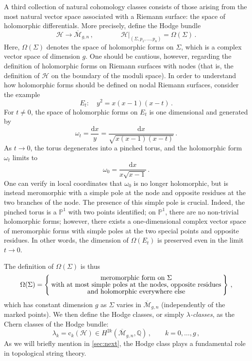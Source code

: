 \documentclass[11pt,reqno]{amsart}
\numberwithin{equation}{section}
\newcommand{\dd}{\mathrm{d}}
\newcommand{\cc}{\mathrm{c}}
\newcommand{\mb}[1]{\mathbb{#1}}
\newcommand{\mc}[1]{\mathcal{#1}}
\newcommand{\Q}{\mb{Q}}
\renewcommand{\P}{\mb{P}}
\newcommand{\M}{\mc{M}}
\newcommand{\Mbar}{\overline{\M}}
\theoremstyle{plain}
\theoremstyle{definition}
\begin{document}
A third collection of natural cohomology classes consists of those arising from the most natural vector space associated with a Riemann surface: the space of holomorphic differentials. More precisely, define the Hodge bundle
\begin{equation}
  \mc{H} \longrightarrow \Mbar_{g,n} \,,
  \qquad\qquad
  \mc{H}|_{(\Sigma,p_1,\dots,p_n)}
  =
  \Omega(\Sigma) \,.
\end{equation}
Here, $\Omega(\Sigma)$ denotes the space of holomorphic forms on $\Sigma$, which is a complex vector space of dimension $g$. One should be cautious, however, regarding the definition of holomorphic forms on Riemann surfaces with nodes (that is, the definition of $\mc{H}$ on the boundary of the moduli space). In order to understand how holomorphic forms should be defined on nodal Riemann surfaces, consider the example
\begin{equation}
  E_t \colon \quad
  y^2 = x (x-1) (x-t) \,.
\end{equation}
For $t \neq 0$, the space of holomorphic forms on $E_t$ is one dimensional and generated by
\begin{equation}
  \omega_t = \frac{\dd x}{y} = \frac{\dd x}{\sqrt{x(x-1)(x-t)}} \,.
\end{equation}
As $t \to 0$, the torus degenerates into a pinched torus, and the holomorphic form $\omega_t$ limits to
\begin{equation}
  \omega_0 = \frac{\dd x}{x \sqrt{x-1}} \,.
\end{equation}
One can verify in local coordinates that $\omega_0$ is no longer holomorphic, but is instead meromorphic with a simple pole at the node and opposite residues at the two branches of the node. The presence of this simple pole is crucial. Indeed, the pinched torus is a $\P^1$ with two points identified; on $\P^1$, there are no non-trivial holomorphic forms; however, there exists a one-dimensional complex vector space of meromorphic forms with simple poles at the two special points and opposite residues. In other words, the dimension of $\Omega(E_t)$ is preserved even in the limit $t \to 0$.

The definition of $\Omega(\Sigma)$ is thus
\begin{equation}
  \Omega(\Sigma)
  =
  \Set{\substack{
    \displaystyle\text{meromorphic form on $\Sigma$} \\
    \displaystyle\text{with at most simple poles at the nodes, opposite residues} \\
    \displaystyle\text{and holomorphic everywhere else}
  }} \,,
\end{equation}
which has constant dimension $g$ as $\Sigma$ varies in $\Mbar_{g,n}$ (independently of the marked points). We then define the Hodge classes, or simply \emph{$\lambda$-classes}, as the Chern classes of the Hodge bundle:
\begin{equation}
  \lambda_k = \cc_k(\mc{H}) \in H^{2k}(\Mbar_{g,n},\Q) \,,
  \qquad
  k = 0, \dots, g \,,
\end{equation}
As we will briefly mention in \cref{sec:next}, the Hodge class plays a fundamental role in topological string theory.
\end{document}
